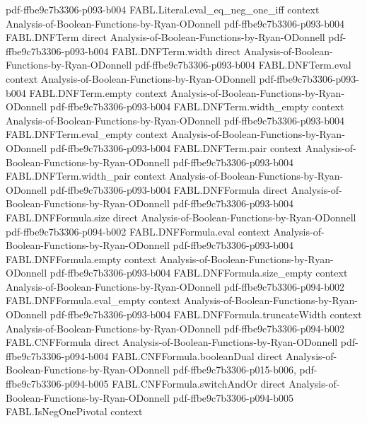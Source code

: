 \begin{theorem}
  {pdf-ffbe9c7b3306-p093-b004}
\proofstep
  {FABL.Literal.eval_eq_neg_one_iff}
  {context}
  {Analysis-of-Boolean-Functions-by-Ryan-ODonnell}
  {pdf-ffbe9c7b3306-p093-b004}
\proofstep
  {FABL.DNFTerm}
  {direct}
  {Analysis-of-Boolean-Functions-by-Ryan-ODonnell}
  {pdf-ffbe9c7b3306-p093-b004}
\proofstep
  {FABL.DNFTerm.width}
  {direct}
  {Analysis-of-Boolean-Functions-by-Ryan-ODonnell}
  {pdf-ffbe9c7b3306-p093-b004}
\proofstep
  {FABL.DNFTerm.eval}
  {context}
  {Analysis-of-Boolean-Functions-by-Ryan-ODonnell}
  {pdf-ffbe9c7b3306-p093-b004}
\proofstep
  {FABL.DNFTerm.empty}
  {context}
  {Analysis-of-Boolean-Functions-by-Ryan-ODonnell}
  {pdf-ffbe9c7b3306-p093-b004}
\proofstep
  {FABL.DNFTerm.width_empty}
  {context}
  {Analysis-of-Boolean-Functions-by-Ryan-ODonnell}
  {pdf-ffbe9c7b3306-p093-b004}
\proofstep
  {FABL.DNFTerm.eval_empty}
  {context}
  {Analysis-of-Boolean-Functions-by-Ryan-ODonnell}
  {pdf-ffbe9c7b3306-p093-b004}
\proofstep
  {FABL.DNFTerm.pair}
  {context}
  {Analysis-of-Boolean-Functions-by-Ryan-ODonnell}
  {pdf-ffbe9c7b3306-p093-b004}
\proofstep
  {FABL.DNFTerm.width_pair}
  {context}
  {Analysis-of-Boolean-Functions-by-Ryan-ODonnell}
  {pdf-ffbe9c7b3306-p093-b004}
\proofstep
  {FABL.DNFFormula}
  {direct}
  {Analysis-of-Boolean-Functions-by-Ryan-ODonnell}
  {pdf-ffbe9c7b3306-p093-b004}
\proofstep
  {FABL.DNFFormula.size}
  {direct}
  {Analysis-of-Boolean-Functions-by-Ryan-ODonnell}
  {pdf-ffbe9c7b3306-p094-b002}
\proofstep
  {FABL.DNFFormula.eval}
  {context}
  {Analysis-of-Boolean-Functions-by-Ryan-ODonnell}
  {pdf-ffbe9c7b3306-p093-b004}
\proofstep
  {FABL.DNFFormula.empty}
  {context}
  {Analysis-of-Boolean-Functions-by-Ryan-ODonnell}
  {pdf-ffbe9c7b3306-p093-b004}
\proofstep
  {FABL.DNFFormula.size_empty}
  {context}
  {Analysis-of-Boolean-Functions-by-Ryan-ODonnell}
  {pdf-ffbe9c7b3306-p094-b002}
\proofstep
  {FABL.DNFFormula.eval_empty}
  {context}
  {Analysis-of-Boolean-Functions-by-Ryan-ODonnell}
  {pdf-ffbe9c7b3306-p093-b004}
\proofstep
  {FABL.DNFFormula.truncateWidth}
  {context}
  {Analysis-of-Boolean-Functions-by-Ryan-ODonnell}
  {pdf-ffbe9c7b3306-p094-b002}
\proofstep
  {FABL.CNFFormula}
  {direct}
  {Analysis-of-Boolean-Functions-by-Ryan-ODonnell}
  {pdf-ffbe9c7b3306-p094-b004}
\proofstep
  {FABL.CNFFormula.booleanDual}
  {direct}
  {Analysis-of-Boolean-Functions-by-Ryan-ODonnell}
  {pdf-ffbe9c7b3306-p015-b006,
    pdf-ffbe9c7b3306-p094-b005}
\proofstep
  {FABL.CNFFormula.switchAndOr}
  {direct}
  {Analysis-of-Boolean-Functions-by-Ryan-ODonnell}
  {pdf-ffbe9c7b3306-p094-b005}
\proofstep
  {FABL.IsNegOnePivotal}
  {context}

\end{theorem}
